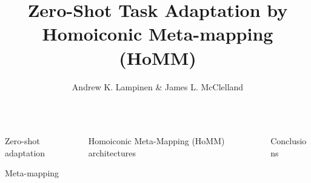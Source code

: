\documentclass[final]{beamer}
\title{Zero-Shot Task Adaptation by Homoiconic Meta-mapping (HoMM)}
\author{Andrew K. Lampinen \& James L. McClelland}
\institute{Department of Psychology, Stanford University}
\begin{document}
\begin{frame}[t]{}
\vspace{-1.5em}
\begin{columns}

\begin{column}[t]{0.248\textwidth}
\begin{block}{\huge Zero-shot adaptation}
\end{block}
\begin{block}{\huge Meta-mapping}
\end{block}
\end{column}
\begin{column}[t]{0.496\textwidth}
\begin{block}{\huge Homoiconic Meta-Mapping (HoMM) architectures}
\end{block}
\end{column}
\begin{column}[t]{0.248\textwidth}
\begin{block}{\huge Conclusions}
\end{block}
\end{column}
\end{columns}
\end{frame}
\end{document}
